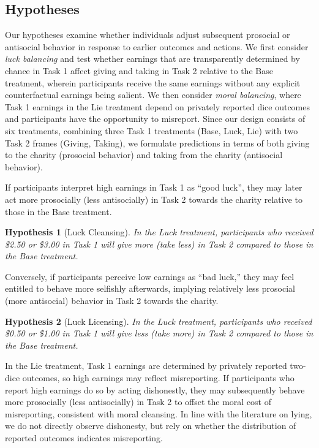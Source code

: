 \documentclass{article}
\newtheorem{hypothesis}{Hypothesis}
\begin{document}
\subsection{Hypotheses} \label{hypotheses}
Our hypotheses examine whether individuals adjust subsequent prosocial or antisocial behavior in response to earlier outcomes and actions. We first consider \textit{luck balancing} and test whether earnings that are transparently determined by chance in Task 1 affect giving and taking in Task 2 relative to the Base treatment, wherein participants receive the same earnings without any explicit counterfactual earnings being salient. We then consider \textit{moral balancing}, where Task 1 earnings in the Lie treatment depend on privately reported dice outcomes and participants have the opportunity to misreport. Since our design consists of six treatments, combining three Task 1 treatments (Base, Luck, Lie) with two Task 2 frames (Giving, Taking), we formulate predictions in terms of both giving to the charity (prosocial behavior) and taking from the charity (antisocial behavior).
\par
If participants interpret high earnings in Task 1 as ``good luck'', they may later act more prosocially (less antisocially) in Task 2 towards the charity relative to those in the Base treatment.
\begin{hypothesis}[Luck Cleansing]
In the Luck treatment, participants who received \$2.50 or \$3.00 in Task 1 will give more (take less) in Task 2 compared to those in the Base treatment.
\end{hypothesis} \noindent
Conversely, if participants perceive low earnings as ``bad luck,'' they may feel entitled to behave more selfishly afterwards, implying relatively less prosocial (more antisocial) behavior in Task 2 towards the charity.
\begin{hypothesis}[Luck Licensing]
In the Luck treatment, participants who received \$0.50 or \$1.00 in Task 1 will give less (take more) in Task 2 compared to those in the Base treatment.
\end{hypothesis} \noindent
In the Lie treatment, Task 1 earnings are determined by privately reported two-dice outcomes, so high earnings may reflect misreporting. If participants who report high earnings do so by acting dishonestly, they may subsequently behave more prosocially (less antisocially) in Task 2 to offset the moral cost of misreporting, consistent with moral cleansing. In line with the literature on lying, we do not directly observe dishonesty, but rely on whether the distribution of reported outcomes indicates misreporting. 
\end{document}
